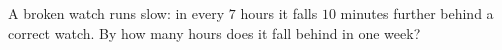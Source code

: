 A broken watch runs slow: in every $7$ hours it falls $10$ minutes further behind a correct watch. By how many hours does it fall behind in one week?
